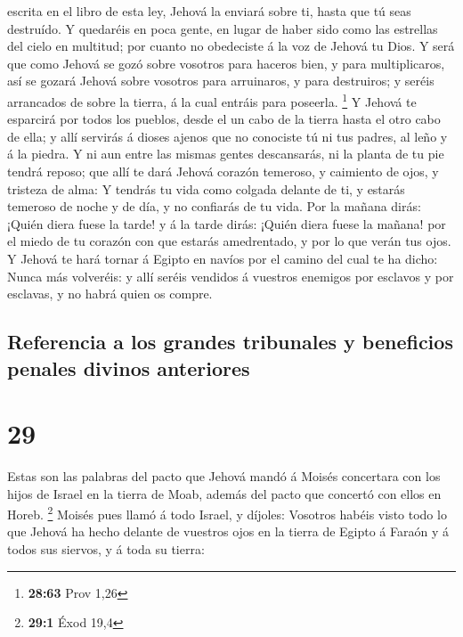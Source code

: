 escrita en el libro de esta ley, Jehová la enviará sobre ti, hasta que
tú seas destruído.  Y quedaréis en poca gente, en lugar
de haber sido como las estrellas del cielo en multitud; por cuanto no
obedeciste á la voz de Jehová tu Dios.  Y será que como
Jehová se gozó sobre vosotros para haceros bien, y para multiplicaros,
así se gozará Jehová sobre vosotros para arruinaros, y para destruiros;
y seréis arrancados de sobre la tierra, á la cual entráis para poseerla.
\footnote{\textbf{28:63} Prov 1,26}  Y Jehová te
esparcirá por todos los pueblos, desde el un cabo de la tierra hasta el
otro cabo de ella; y allí servirás á dioses ajenos que no conociste tú
ni tus padres, al leño y á la piedra.  Y ni aun entre las
mismas gentes descansarás, ni la planta de tu pie tendrá reposo; que
allí te dará Jehová corazón temeroso, y caimiento de ojos, y tristeza de
alma:  Y tendrás tu vida como colgada delante de ti, y
estarás temeroso de noche y de día, y no confiarás de tu vida.
 Por la mañana dirás: ¡Quién diera fuese la tarde! y á la
tarde dirás: ¡Quién diera fuese la mañana! por el miedo de tu corazón
con que estarás amedrentado, y por lo que verán tus ojos.
 Y Jehová te hará tornar á Egipto en navíos por el camino
del cual te ha dicho: Nunca más volveréis: y allí seréis vendidos á
vuestros enemigos por esclavos y por esclavas, y no habrá quien os
compre.

\hypertarget{referencia-a-los-grandes-tribunales-y-beneficios-penales-divinos-anteriores}{%
\subsection{Referencia a los grandes tribunales y beneficios penales
divinos
anteriores}\label{referencia-a-los-grandes-tribunales-y-beneficios-penales-divinos-anteriores}}

\hypertarget{section-28}{%
\section{29}\label{section-28}}

 Estas son las palabras del pacto que Jehová mandó á
Moisés concertara con los hijos de Israel en la tierra de Moab, además
del pacto que concertó con ellos en Horeb. \footnote{\textbf{29:1} Éxod
  19,4}  Moisés pues llamó á todo Israel, y díjoles:
Vosotros habéis visto todo lo que Jehová ha hecho delante de vuestros
ojos en la tierra de Egipto á Faraón y á todos sus siervos, y á toda su
tierra:

